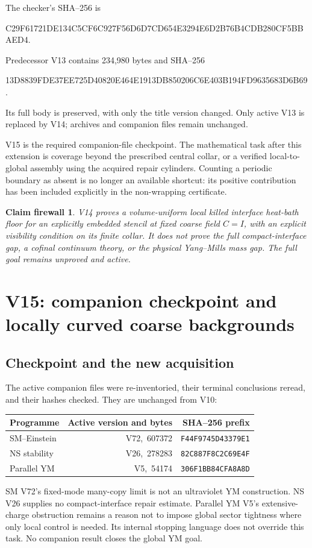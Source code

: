 \documentclass[11pt,oneside]{article}
\newtheorem{firewall}[theorem]{Claim firewall}
\begin{document}
The checker's SHA--256 is
\begin{center}\scriptsize\ttfamily
C29F61721DE134C5CF6C927F56D6D7CD654E3294E6D2B76B4CDB280CF5BBAED4.
\end{center}
Predecessor V13 contains 234,980 bytes
and SHA--256
\begin{center}\scriptsize\ttfamily
13D8839FDE37EE725D40820E464E1913DB850206C6E403B194FD9635683D6B69.
\end{center}
Its full body is preserved, with
only the title version changed.
Only active V13 is replaced by V14;
archives and companion files remain
unchanged.

V15 is the required companion-file
checkpoint. The mathematical task
after this extension is coverage
beyond the prescribed central collar,
or a verified local-to-global
assembly using the acquired repair
cylinders. Counting a periodic
boundary as absent is no longer
an available shortcut: its positive
contribution has been included
explicitly in the non-wrapping
certificate.

\begin{firewall}
V14 proves a volume-uniform local
killed interface heat-bath floor
for an explicitly embedded stencil
at fixed coarse field \(C=I\), with
an explicit visibility condition
on its finite collar. It does not
prove the full compact-interface
gap, a cofinal continuum theory,
or the physical Yang--Mills mass
gap. The full goal remains
unproved and active.
\end{firewall}
\section{V15: companion checkpoint and locally curved coarse backgrounds}
\label{sec:f13v15}

\subsection{Checkpoint and the new acquisition}

The active companion files were re-inventoried, their
terminal conclusions reread, and their hashes checked.
They are unchanged from V10:
\begin{center}\small
\begin{tabular}{lrr}
\toprule
Programme&Active version and bytes&SHA--256 prefix\\
\midrule
SM--Einstein&V72,\ 607372&\texttt{F44F9745D43379E1}\\
NS stability&V26,\ 278283&\texttt{82C887F8C2C69E4F}\\
Parallel YM&V5,\ 54174&\texttt{306F1BB84CFA8A8D}\\
\bottomrule
\end{tabular}
\end{center}
SM V72's fixed-mode many-copy limit is not an
ultraviolet YM construction. NS V26 supplies no
compact-interface repair estimate. Parallel YM
V5's extensive-charge obstruction remains a
reason not to impose global sector tightness
where only local control is needed. Its internal
stopping language does not override this task.
No companion result closes the global YM goal.
\end{document}
